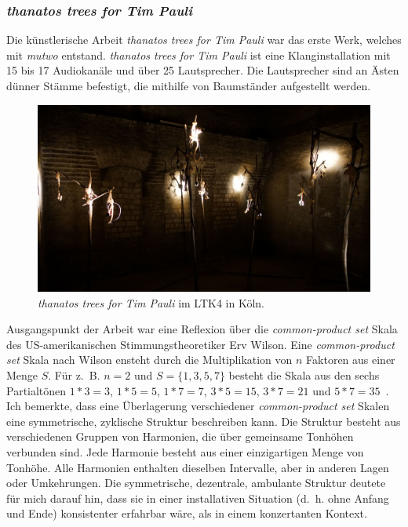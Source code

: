 \documentclass[12pt,a4paper,ngerman]{article}
\begin{document}
\subsubsection{\emph{thanatos trees for Tim Pauli}}

Die künstlerische Arbeit \emph{thanatos trees for Tim Pauli} war das erste Werk, welches mit \emph{mutwo} entstand.
\emph{thanatos trees for Tim Pauli} ist eine Klanginstallation mit 15 bis 17 Audiokanäle und über 25 Lautsprecher.
Die Lautsprecher sind an Ästen dünner Stämme befestigt, die mithilfe von Baumständer aufgestellt werden.

\begin{figure}[h!]
    \includegraphics[scale=0.28]{pictures/ltk4_open_call_2021_6.jpg}

    \caption{%
        \emph{thanatos trees for Tim Pauli} im LTK4 in Köln.
    }
\end{figure}

Ausgangspunkt der Arbeit war eine Reflexion über die \emph{common-product set} Skala des US-amerikanischen Stimmungstheoretiker Erv Wilson.
Eine \emph{common-product set} Skala nach Wilson ensteht durch die Multiplikation von $n$ Faktoren aus einer Menge $S$.
Für z.~B. $n=2$ und $S=\{1, 3, 5, 7\}$ besteht die Skala aus den sechs Partialtönen $1*3=3$, $1*5=5$, $1*7=7$, $3*5=15$, $3*7=21$ und $5*7=35$~\parencite[S. 150f]{ervWilsonBook}.
Ich bemerkte, dass eine Überlagerung verschiedener \emph{common-product set} Skalen eine symmetrische, zyklische Struktur beschreiben kann.
Die Struktur besteht aus verschiedenen Gruppen von Harmonien, die über gemeinsame Tonhöhen verbunden sind.
Jede Harmonie besteht aus einer einzigartigen Menge von Tonhöhe.
Alle Harmonien enthalten dieselben Intervalle, aber in anderen Lagen oder Umkehrungen.
Die symmetrische, dezentrale, ambulante Struktur deutete für mich darauf hin, dass sie in einer installativen Situation (d.~h. ohne Anfang und Ende) konsistenter erfahrbar wäre, als in einem konzertanten Kontext.
\end{document}
